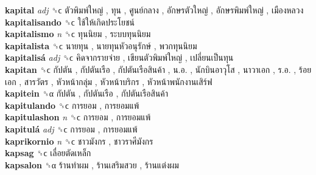 \textbf{kapital} \emph{adj}  ␝ϲ   ตัวพิมพ์ใหญ่ ,  ทุน ,  ศูนย์กลาง ,  อักษรตัวใหญ่ ,  อักษรพิมพ์ใหญ่ ,  เมืองหลวง   \\
\textbf{kapitalisando} ␝ϲ   ใช้ให้เกิดประโยชน์   \\
\textbf{kapitalismo} \emph{n}  ␝ϲ   ทุนนิยม ,  ระบบทุนนิยม   \\
\textbf{kapitalista} ␝ϲ   นายทุน ,  นายทุนหัวอนุรักษ์ ,  พวกทุนนิยม   \\
\textbf{kapitalisá} \emph{adj}  ␝ϲ   คิดจากรายจ่าย ,  เขียนตัวพิมพ์ใหญ่ ,  เปลี่ยนเป็นทุน   \\
\textbf{kapitan} ␝ϲ   กัปตัน ,  กัปตันเรือ ,  กัปตันเรือสินค้า ,  น.อ. ,  นักบินอาวุโส ,  นาวาเอก ,  ร.อ. ,  ร้อยเอก ,  สารวัตร ,  หัวหน้ากลุ่ม ,  หัวหน้าบริกร ,  หัวหน้าพนักงานเสิร์ฟ   \\
\textbf{kapitein} ␝α   กัปตัน ,  กัปตันเรือ ,  กัปตันเรือสินค้า   \\
\textbf{kapitulando} ␝ϲ   การยอม ,  การยอมแพ้   \\
\textbf{kapitulashon} \emph{n}  ␝ϲ   การยอม ,  การยอมแพ้   \\
\textbf{kapitulá} \emph{adj}  ␝ϲ   การยอม ,  การยอมแพ้   \\
\textbf{kaprikornio} \emph{n}  ␝ϲ   ชาวมังกร ,  ชาวราศีมังกร   \\
\textbf{kapsag} ␝ϲ   เลื่อยตัดเหล็ก   \\
\textbf{kapsalon} ␝α   ร้านทำผม ,  ร้านเสริมสวย ,  ร้านแต่งผม   \\
